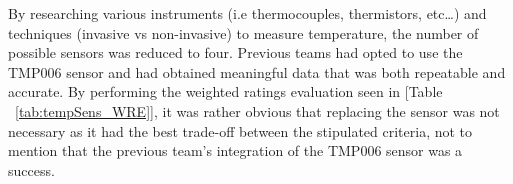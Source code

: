 \begin{table}[H]
\caption{\label{tab:tempSens_WRE}Weighted Ratings Evaluation of Temperature Sensors.}
\centering
{}
\end{table}

\indent\indent By researching various instruments (i.e thermocouples, thermistors, etc…) and techniques (invasive vs non-invasive) to measure temperature, the number of possible sensors was reduced to four. Previous teams had opted to use the TMP006 sensor and had obtained meaningful data that was both repeatable and accurate. By performing the weighted ratings evaluation seen in [Table ~\ref{tab:tempSens_WRE}], it was rather obvious that replacing the sensor was not necessary as it had the best trade-off between the stipulated criteria, not to mention that the previous team's integration of the TMP006 sensor was a success.

